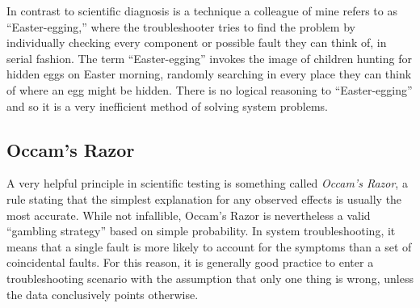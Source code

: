 \vskip 10pt

In contrast to scientific diagnosis is a technique a colleague of mine refers to as ``Easter-egging,'' where the troubleshooter tries to find the problem by individually checking every component or possible fault they can think of, in serial fashion.  The term ``Easter-egging'' invokes the image of children hunting for hidden eggs on Easter morning, randomly searching in every place they can think of where an egg might be hidden.  There is no logical reasoning to ``Easter-egging'' and so it is a very inefficient method of solving system problems.


















\filbreak
\subsection{Occam's Razor}

A very helpful principle in scientific testing is something called \textit{Occam's Razor}, a rule stating that the simplest explanation for any observed effects is usually the most accurate.  While not infallible, Occam's Razor is nevertheless a valid ``gambling strategy'' based on simple probability.  In system troubleshooting, it means that a single fault is more likely to account for the symptoms than a set of coincidental faults.  For this reason, it is generally good practice to enter a troubleshooting scenario with the assumption that only one thing is wrong, unless the data conclusively points otherwise.

